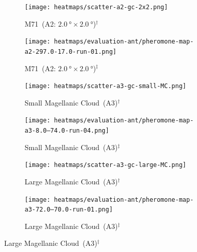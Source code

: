 \begin{figure}[H]
\begin{subfigure}[b]{0.241\textwidth}
        \centering
        \captionsetup{justification=centering,format=hang}
        \texttt{[image: heatmaps/scatter-a2-gc-2x2.png]}
        \caption{\label{fig:scatter-M71-dog-2b2}M71~(A2: $\SI{2.0}{\degree}\times\SI{2.0}{\degree}$)$^{\dagger}$}
    \end{subfigure}
    \begin{subfigure}[b]{0.241\textwidth}
        \centering
        \captionsetup{justification=centering,format=hang}
        \texttt{[image: heatmaps/evaluation-ant/pheromone-map-a2-297.0-17.0-run-01.png]}
        \caption{\label{fig:heat-m71-dog-2b2}M71~(A2: $\SI{2.0}{\degree}\times\SI{2.0}{\degree}$)$^{\ddagger}$}
    \end{subfigure}

    \begin{subfigure}[b]{0.241\textwidth}
        \centering
        \captionsetup{justification=centering,format=hang}
        \texttt{[image: heatmaps/scatter-a3-gc-small-MC.png]}
        \caption{\label{fig:scatter-small-magellanic-cloud}Small Magellanic Cloud~(A3)$^{\dagger}$}
    \end{subfigure}
    \begin{subfigure}[b]{0.241\textwidth}
        \centering
        \captionsetup{justification=centering,format=hang}
        \texttt{[image: heatmaps/evaluation-ant/pheromone-map-a3-8.0--74.0-run-04.png]}
        \caption{\label{fig:heat-small-magellanic-cloud}Small Magellanic Cloud~(A3)$^{\ddagger}$}
    \end{subfigure}
    \hspace{0.3em}
    \begin{subfigure}[b]{0.241\textwidth}
        \centering
        \captionsetup{justification=centering,format=hang}
        \texttt{[image: heatmaps/scatter-a3-gc-large-MC.png]}
        \caption{\label{fig:scatter-large-magellanic-cloud}Large Magellanic Cloud~(A3)$^{\dagger}$}
    \end{subfigure}
    \begin{subfigure}[b]{0.241\textwidth}
        \centering
        \captionsetup{justification=centering,format=hang}
        \texttt{[image: heatmaps/evaluation-ant/pheromone-map-a3-72.0--70.0-run-01.png]}
        \caption{\label{fig:heat-large-magellanic-cloud}Large Magellanic Cloud~(A3)$^{\ddagger}$}
    \end{subfigure}


\end{figure}
